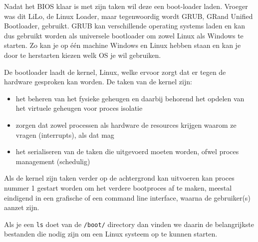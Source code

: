 Nadat het BIOS klaar is met zijn taken wil deze een boot-loader laden. Vroeger was dit LiLo, de Linux Loader, maar tegenwoordig wordt GRUB, GRand Unified Bootloader, gebruikt. GRUB kan verschillende operating systems laden en kan dus gebruikt worden als universele bootloader om zowel Linux als Windows te starten. Zo kan je op \'e\'en machine Windows en Linux hebben staan en kan je door te herstarten kiezen welk OS je wil gebruiken.

De bootloader laadt de kernel, Linux, welke ervoor zorgt dat er tegen de hardware gesproken kan worden. De taken van de kernel zijn:
\begin{itemize}
\item het beheren van het fysieke geheugen en daarbij behorend het opdelen van het virtuele geheugen voor proces isolatie
\item zorgen dat zowel processen als hardware de resources krijgen waarom ze vragen (interrupts), als dat mag
\item het serialiseren van de taken die uitgevoerd moeten worden, ofwel proces management (schedulig)
\end{itemize}

Als de kernel zijn taken verder op de achtergrond kan uitvoeren kan proces nummer 1 gestart worden om het verdere bootproces af te maken, meestal eindigend in een grafische of een command line interface, waarna de gebruiker(s) aanzet zijn.

Als je een \texttt{ls} doet van de \texttt{/boot/} directory dan vinden we daarin de belangrijkste bestanden die nodig zijn om een Linux systeem op te kunnen starten.

